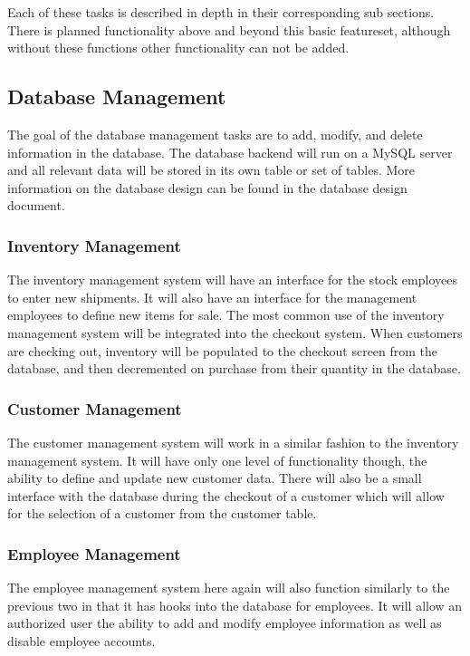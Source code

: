 \documentclass{report}
\begin{document}
Each of these tasks is described in depth in their corresponding
sub sections. There is planned functionality above and beyond this
basic featureset, although without these functions other
functionality can not be added.

    \subsection{Database Management}
    The goal of the database management tasks are to add, modify, and
    delete information in the database. The database backend will run
    on a MySQL server and all relevant data will be stored in its own
    table or set of tables. More information on the database design
    can be found in the database design document.

    \subsubsection{Inventory Management}
    The inventory management system will have an interface for the
    stock employees to enter new shipments. It will also have an
    interface for the management employees to define new items for
    sale. The most common use of the inventory management system will
    be integrated into the checkout system. When customers are
    checking out, inventory will be populated to the checkout screen
    from the database, and then decremented on purchase from their
    quantity in the database.

    \subsubsection{Customer Management}
    The customer management system will work in a similar fashion to
    the inventory management system. It will have only one level of
    functionality though, the ability to define and update new
    customer data. There will also be a small interface with the
    database during the checkout of a customer which will allow for
    the selection of a customer from the customer table.

    \subsubsection{Employee Management}
    The employee management system here again will also function
    similarly to the previous two in that it has hooks into the
    database for employees. It will allow an authorized user the
    ability to add and modify employee information as well as
    disable employee accounts.\\
    \\
\end{document}
